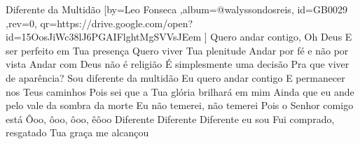 \beginsong
{Diferente da Multidão %
}[by={Leo Fonseca %
},album={@walyssondosreis},
id={GB0029 %
},rev={0}, %
qr={https://drive.google.com/open?id=15OosJiWc38lJ6PGAIFlghtMgSVVsJEem %
}]
\beginverse*
Quero andar contigo, Oh Deus
E ser perfeito em Tua presença
Quero viver Tua plenitude
Andar por fé e não por vista
\endverse
\beginverse*
Andar com Deus não é religião
É simplesmente uma decisão
Pra que viver de aparência?
Sou diferente da multidão
\endverse
\beginchorus
Eu quero andar contigo
E permanecer nos Teus caminhos
Pois sei que a Tua glória brilhará em mim
Ainda que eu ande pelo vale da sombra da morte
Eu não temerei, não temerei
Pois o Senhor comigo está
Ôoo, ôoo, ôoo, êôoo
\endchorus
\beginverse*
Diferente
Diferente
Diferente eu sou
Fui comprado, resgatado
Tua graça me alcançou
\endverse
\vspace{4em} %
\begin{comment}
\lstset{basicstyle=\scriptsize\bf} %
\tab{Solo 1}
\begin{lstlisting}
E|-----------------------------------------------------|
B|-----------------------------------------------------|
G|-----------------------------------------------------|
D|-----------------------------------------------------|
A|-----------------------------------------------------|
E|-----------------------------------------------------|
\end{lstlisting}
\end{comment}
 
